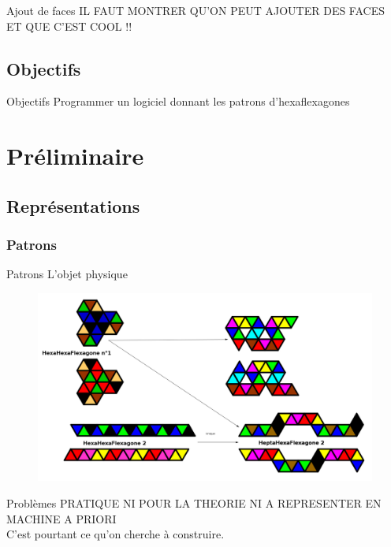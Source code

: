 \documentclass[french,xcolor=dvipsnames]{beamer}
\begin{document}
		\begin{frame}{Ajout de faces}
		IL FAUT MONTRER QU'ON PEUT AJOUTER DES FACES ET QUE C'EST COOL !!
		\end{frame}
		
		\subsection{Objectifs}
		\begin{frame}{Objectifs}
			Programmer un logiciel donnant les patrons d'hexaflexagones
		\end{frame}
		
		
	\section{Préliminaire}
	
		\subsection{Représentations}
		
		\subsubsection{Patrons}
		\begin{frame}{Patrons}
			L'objet physique
			\begin{figure}
				\includegraphics[scale=0.19]{exemples_patrons.png}
			\end{figure}
		\end{frame}
		
		\begin{frame}{Problèmes}
			PRATIQUE NI POUR LA THEORIE NI A REPRESENTER EN MACHINE A PRIORI\\
			C'est pourtant ce qu'on cherche à construire.
		\end{frame}
				
\end{document}
